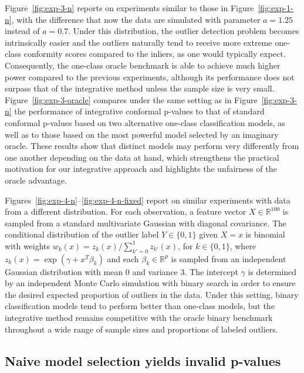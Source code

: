 \documentclass[11pt]{article}
\begin{document}
Figure~\ref{fig:exp-3-n} reports on experiments similar to those in Figure~\ref{fig:exp-1-n}, with the difference that now the data are simulated with parameter $a=1.25$ instead of $a=0.7$. Under this distribution, the outlier detection problem becomes intrinsically easier and the outliers naturally tend to receive more extreme one-class conformity scores compared to the inliers, as one would typically expect. Consequently, the one-class oracle benchmark is able to achieve much higher power compared to the previous experiments, although its performance does not surpass that of the integrative method unless the sample size is very small.
Figure~\ref{fig:exp-3-oracle} compares under the same setting as in Figure~\ref{fig:exp-3-n}  the performance of integrative conformal p-values to that of standard conformal p-values based on two alternative one-class classification models, as well as to those based on the most powerful model selected by an imaginary oracle. These results show that distinct models may perform very differently from one another depending on the data at hand, which strengthens the practical motivation for our integrative approach and highlights the unfairness of the oracle advantage.

Figures~\ref{fig:exp-4-n}--\ref{fig:exp-4-n-fixed} report on similar experiments with data from a different distribution. For each observation, a feature vector $X \in \mathbb{R}^{100}$ is sampled from a standard multivariate Gaussian with diagonal covariance.
The conditional distribution of the outlier label $Y \in \{0,1\}$ given $X=x$ is binomial with weights
$w_k(x) = z_k(x) / \sum_{k'=0}^{1} z_{k'}(x)$, for $k \in \{0,1\}$, where $z_k(x) = \exp(\gamma + x^T \beta_k)$ and each $\beta_k \in \mathbb{R}^{p}$ is sampled from an independent Gaussian distribution with mean 0 and variance $3$.
The intercept $\gamma$ is determined by an independent Monte Carlo simulation with binary search in order to ensure the desired expected proportion of outliers in the data.
Under this setting, binary classification models tend to perform better than one-class models, but the integrative method remains competitive with the oracle binary benchmark throughout a wide range of sample sizes and proportions of labeled outliers.


\subsection{Naive model selection yields invalid p-values} \label{sec:experiments-naive}
\end{document}
